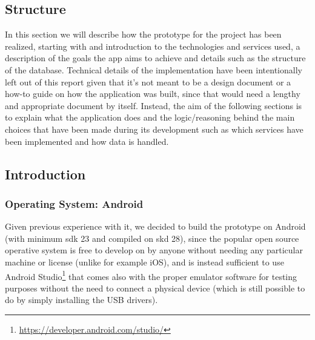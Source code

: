 
\subsection{Structure}
\label{ApplicationStructure}
In this section we will describe how the prototype for the project has been realized, starting with and introduction to the technologies and services used, a description of the goals the app aims to achieve and details such as the structure of the database. Technical details of the implementation have been intentionally left out of this report given that it's not meant to be a design document or a how-to guide on how the application was built, since that would need a lengthy and appropriate document by itself. Instead, the aim of the following sections is to explain what the application does and the logic/reasoning behind the main choices that have been made during its development such as which services have been implemented and how data is handled.
\subsection{Introduction}
\label{App:Introduction}
\subsubsection{Operating System: Android}
Given previous experience with it, we decided to build the prototype on Android (with minimum sdk 23 and compiled on skd 28), since the popular open source operative system is free to develop on by anyone without needing any particular machine or license (unlike for example iOS), and is instead sufficient to use Android Studio\footnote{\url{https://developer.android.com/studio/}} that comes also with the proper emulator software for testing purposes without the need to connect a physical device (which is still possible to do by simply installing the USB drivers).
